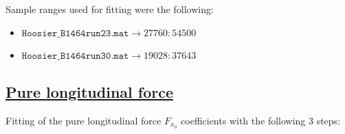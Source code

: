 \documentclass{IEEEtran}
\begin{document}
        Sample ranges used for fitting were the following:
        \begin{itemize}
            \item $\texttt{Hoosier\_B1464run23.mat} \rightarrow 27760:54500$
            \item $\texttt{Hoosier\_B1464run30.mat} \rightarrow 19028:37643$\\
        \end{itemize}
        
        \newpage
    
    \subsection{\textbf{\underline{Pure longitudinal force}}}
        Fitting of the pure longitudinal force $F_{x_0}$ coefficients with the following 3 steps:
\end{document}
